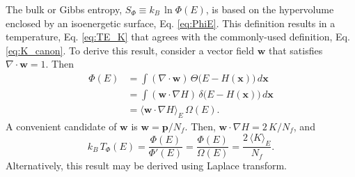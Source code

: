 \documentclass[reprint]{revtex4-1}
\begin{document}
The bulk
or Gibbs entropy\cite{cagin1988, haile, dunkel2014},
$S_\Phi \equiv k_B \, \ln \Phi(E)$,
is based on the hypervolume enclosed by an isoenergetic surface,
Eq. \eqref{eq:PhiE}.
%
This definition results in a temperature, Eq. \eqref{eq:TE_K}
that agrees with the commonly-used definition,
Eq. \eqref{eq:K_canon}.
%
To derive this result,
consider a vector field $\mathbf w$
that satisfies $\nabla \cdot \mathbf w = 1$.
Then
%
\begin{align*}
  \Phi(E)
  &=
  \int
    \left(
      \nabla \cdot \mathbf w
    \right)
    \,
    \Theta\bigl(
      E - H(\mathbf x)
    \bigr)
    \, d\mathbf x
  \\
  &=
  \int
    \left( \mathbf w \cdot \nabla H \right)
    \,
    \delta\bigl(
      E - H(\mathbf x)
    \bigr)
    \, d\mathbf x
  \\
  &= \langle \mathbf w \cdot \nabla H \rangle_E
    \,
    \Omega(E)
  .
\end{align*}
%
A convenient candidate of $\mathbf w$ is
$\mathbf w = \mathbf p / N_f$.
%
Then,
$\mathbf w \cdot \nabla H = 2 \, K / N_f$,
and
%
\begin{equation}
  k_B \, T_\Phi(E)
  =
  \frac{ \Phi(E) } { \Phi'(E) }
  =
  \frac{ \Phi(E) } { \Omega(E) }
  =
  \frac{ 2 \, \langle K \rangle_E } { N_f }
  .
  \label{eq:Tbulk}
\end{equation}
%
Alternatively, this result may be derived using
Laplace transform\cite{pearson1985, haile}.
%
%
%
%
\end{document}
